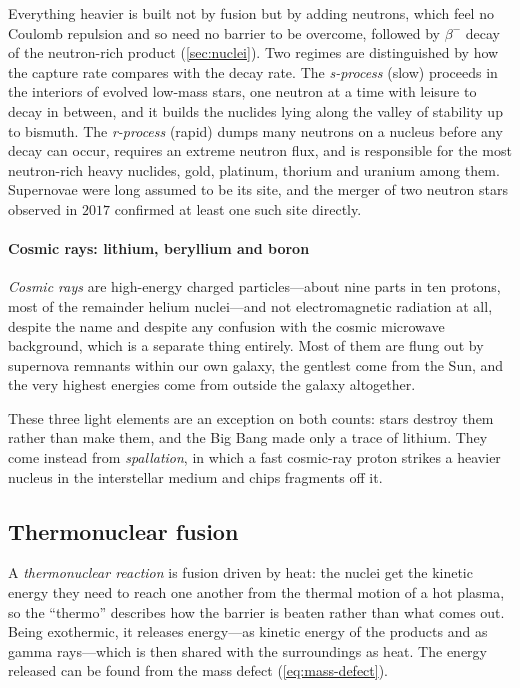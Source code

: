     Everything heavier is built not by fusion but by adding neutrons, which feel no Coulomb repulsion and so need no barrier to be overcome, followed by $\beta^{-}$ decay of the neutron-rich product (\cref{sec:nuclei}). Two regimes are distinguished by how the capture rate compares with the decay rate. The \emph{s-process} (slow) proceeds in the interiors of evolved low-mass stars, one neutron at a time with leisure to decay in between, and it builds the nuclides lying along the valley of stability up to bismuth. The \emph{r-process} (rapid) dumps many neutrons on a nucleus before any decay can occur, requires an extreme neutron flux, and is responsible for the most neutron-rich heavy nuclides, gold, platinum, thorium and uranium among them. Supernovae were long assumed to be its site, and the merger of two neutron stars observed in $2017$ confirmed at least one such site directly.

    \paragraph{Cosmic rays: lithium, beryllium and boron}

    \emph{Cosmic rays} are high-energy charged particles---about nine parts in ten protons, most of the remainder helium nuclei---and not electromagnetic radiation at all, despite the name and despite any confusion with the cosmic microwave background, which is a separate thing entirely. Most of them are flung out by supernova remnants within our own galaxy, the gentlest come from the Sun, and the very highest energies come from outside the galaxy altogether.

    These three light elements are an exception on both counts: stars destroy them rather than make them, and the Big Bang made only a trace of lithium. They come instead from \emph{spallation}, in which a fast cosmic-ray proton strikes a heavier nucleus in the interstellar medium and chips fragments off it.

    \subsection{Thermonuclear fusion}

        A \emph{thermonuclear reaction} is fusion driven by heat: the nuclei get the kinetic energy they need to reach one another from the thermal motion of a hot plasma, so the \enquote{thermo} describes how the barrier is beaten rather than what comes out. Being exothermic, it releases energy---as kinetic energy of the products and as gamma rays---which is then shared with the surroundings as heat. The energy released can be found from the mass defect (\cref{eq:mass-defect}).

